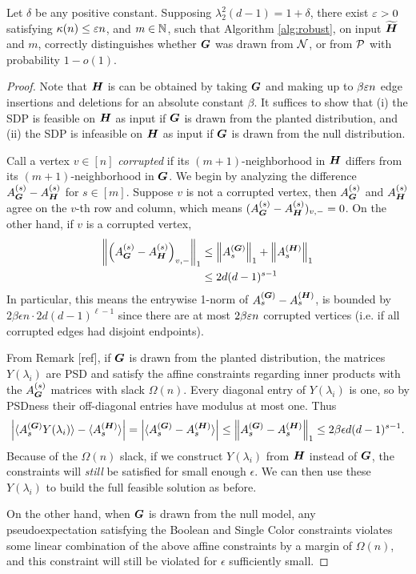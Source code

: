 \begin{theorem}
    Let $\delta$ be any positive constant. Supposing $\lambda^2_2(d-1) = 1+\delta$, there exist $\varepsilon > 0$ satisfying $\kappa(n)\le\varepsilon n$, and $m \in \mathbb{N}$, such that Algorithm \ref{alg:robust}, on input $\widetilde{\boldsymbol{H}}$ and $m$, correctly distinguishes whether $\boldsymbol{G}$ was drawn from $\mathcal{N}$, or from $\mathcal{P}$ with probability $1-o(1)$.
\end{theorem}
\begin{proof}
	Note that $\boldsymbol{H}$ is can be obtained by taking $\boldsymbol{G}$ and making up to $\beta\varepsilon n$ edge insertions and deletions for an absolute constant $\beta$. It suffices to show that (i) the SDP is feasible on $\boldsymbol{H}$ as input if $\boldsymbol{G}$ is drawn from the planted distribution, and (ii) the SDP is infeasible on $\boldsymbol{H}$ as input if $\boldsymbol{G}$ is drawn from the null distribution.

	Call a vertex $v \in [n]$ \emph{corrupted} if its $(m+1)$-neighborhood in $\boldsymbol{H}$ differs from its $(m+1)$-neighborhood in $\boldsymbol{G}$.  We begin by analyzing the difference $A^{(s)}_{\boldsymbol{G}} -A^{(s)}_{\boldsymbol{H}}$ for $s\in[m]$. Suppose $v$ is not a corrupted vertex, then $A^{(s)}_{\boldsymbol{G}}$ and $A^{(s)}_{\boldsymbol{H}}$ agree on the $v$-th row and column, which means $(A^{(s)}_{\boldsymbol{G}}-A^{(s)}_{\boldsymbol{H}})_{v,-} = 0$. On the other hand, if $v$ is a corrupted vertex,
	\begin{align*}
		\left\|\left(A^{(s)}_{\boldsymbol{G}}-A^{(s)}_{\boldsymbol{H}}\right)_{v,-}\right\|_1 &\le \left\|A^{(\boldsymbol{G})}_{s}\right\|_1 + \left\|A^{(\boldsymbol{H})}_{s}\right\|_1\\
		&\le 2d(d-1)^{s-1}
	\end{align*}
	In particular, this means the entrywise 1-norm of $A^{(\boldsymbol{G})}_{s}-A^{(\boldsymbol{H})}_{s}$, is bounded by $2\beta\epsilon n\cdot 2d(d-1)^{\ell-1}$ since there are at most $2\beta\varepsilon n$ corrupted vertices (i.e. if all corrupted edges had disjoint endpoints).
	
	From Remark [ref], if $\boldsymbol{G}$ is drawn from the planted distribution, the matrices $Y(\lambda_i)$ are PSD and satisfy the affine constraints regarding inner products with the $A^{(s)}_{\boldsymbol{G}}$ matrices with slack $\Omega(n)$. Every diagonal entry of $Y(\lambda_i)$ is one, so by PSDness their off-diagonal entries have modulus at most one. Thus
	$$
        \left|\langle A^{(\boldsymbol{G})}_{s} Y(\lambda_i) \rangle - \langle A^{(\boldsymbol{H})}_{s}\rangle \right| = \left|	\langle A^{(\boldsymbol{G})}_{s} - A^{(\boldsymbol{H})}_{s}\rangle\right| \le \left\|A^{(\boldsymbol{G})}_{s} - A^{(\boldsymbol{H})}_{s}\right\|_1 \le 2\beta\epsilon d(d-1)^{s-1}.
	$$
    Because of the $\Omega(n)$ slack, if we construct $Y(\lambda_i)$ from $\boldsymbol{H}$ instead of $\boldsymbol{G}$, the constraints will \emph{still} be satisfied for small enough $\epsilon$. We can then use these $Y(\lambda_i)$ to build the full feasible solution as before.
    
    On the other hand, when $\boldsymbol{G}$ is drawn from the null model, any pseudoexpectation satisfying the Boolean and Single Color constraints violates some linear combination of the above affine constraints by a margin of $\Omega(n)$, and this constraint will still be violated for $\epsilon$ sufficiently small.
    \end{proof}
